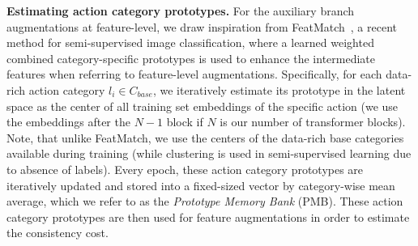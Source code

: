 \documentclass[lettersize,journal]{IEEEtran}
\begin{document}
\noindent\textbf{Estimating action category prototypes.} 
For the auxiliary branch augmentations at feature-level, we draw inspiration from FeatMatch~\cite{kuo2020featmatch}, a recent method for semi-supervised image classification, where a learned weighted combined category-specific prototypes is used to enhance the intermediate features when referring to feature-level augmentations.
Specifically, for each data-rich action category $l_i \in C_{base}$, we iteratively estimate its prototype in the latent space as the center of all training set embeddings of the specific action (we use the embeddings after the $N{-}1$ block if $N$ is our number of transformer blocks).
Note, that unlike FeatMatch, we use the centers of the data-rich base categories available during training (while clustering is used in semi-supervised learning due to absence of labels). 
Every epoch, these action category prototypes are iteratively updated and stored into a fixed-sized vector by category-wise mean average, which we refer to as the \textit{Prototype Memory Bank} (PMB).
These action category prototypes are then used for feature augmentations in order to estimate the consistency cost. 
\end{document}
